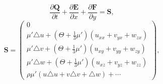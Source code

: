 \begin{equation}
 \frac{\partial \bm{Q}}{\partial t} 
  + \frac{\partial \bm{E}}{\partial x} 
  + \frac{\partial \bm{F}}{\partial y} 
  = \bm{S},
\end{equation}
\begin{equation}
 \bm{S} =
  \begin{pmatrix}
   0 \\
  \mu' \triangle u
   + (\Theta + \frac{1}{3}\mu') (u_{xx} + v_{yx} + w_{zx})  \\
   \mu' \triangle v
   + (\Theta + \frac{1}{3}\mu') (u_{xy} + v_{yy} + w_{zy}) \\
   \mu' \triangle w
   + (\Theta + \frac{1}{3}\mu') (u_{xz} + v_{yz} + w_{zz}) \\
   \rho\mu' (u\triangle u + v\triangle v + \triangle w) + \cdots   
  \end{pmatrix},
\end{equation}